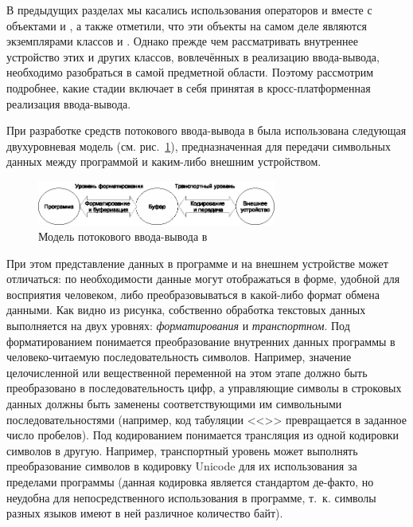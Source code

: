 В предыдущих разделах мы касались использования операторов \Sys{{<}{<}} и
\Sys{{>}{>}} вместе с объектами   и
, а также отметили, что эти объекты на самом деле являются экземплярами классов
 и . Однако прежде чем рассматривать внутреннее устройство
этих и других классов, вовлечённых в реализацию ввода-вывода, необходимо разобраться в самой предметной области.
Поэтому рассмотрим подробнее, какие стадии включает в себя принятая в  кросс-платформенная реализация ввода-вывода. 

При разработке средств потокового ввода-вывода в  была использована следующая двухуровневая модель 
(см. рис.~\ref{ch10:refDrawing2}), предназначенная для передачи символьных данных между программой и каким-либо внешним
устройством. 

\begin{figure}[htb]
\begin{center}
\includegraphics[width=0.7\textwidth]{img/ris_10_3}
\caption{Модель потокового ввода-вывода в }
\label{ch10:refDrawing2}
\end{center}
\end{figure}

При этом представление данных в программе и на внешнем устройстве может  отличаться: по необходимости данные могут
отображаться в форме, удобной для восприятия человеком, либо преобразовываться в какой-либо формат обмена данными. Как
видно из рисунка, собственно обработка текстовых данных выполняется на двух уровнях:
\emph{форматирования} и \emph{транспортном}. Под форматированием понимается
преобразование внутренних данных программы в человеко-читаемую последовательность символов. Например, значение
целочисленной или вещественной переменной на этом этапе должно быть преобразовано в последовательность цифр, а
управляющие символы в строковых данных должны быть заменены соответствующими им символьными последовательностями
(например, код табуляции <<>> превращается в заданное число пробелов). Под
кодированием понимается трансляция из одной кодировки символов в другую. Например, транспортный уровень может выполнять
преобразование символов в кодировку Unicode для их использования за пределами программы (данная кодировка является
стандартом де-факто, но неудобна для непосредственного использования в программе,  т.~к. символы разных языков имеют в
ней различное количество байт).

